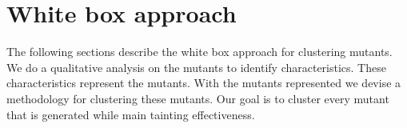 \documentclass[../main]{subfiles}
\begin{document}
\chapter{White box approach}
\label{ch:reserach_question1}
The following sections describe the white box approach for clustering mutants.
We do a qualitative analysis on the mutants to identify characteristics. 
These characteristics represent the mutants.
With the mutants represented we devise a methodology for clustering these mutants.
Our goal is to cluster every mutant that is generated while main tainting effectiveness.




\end{document}
